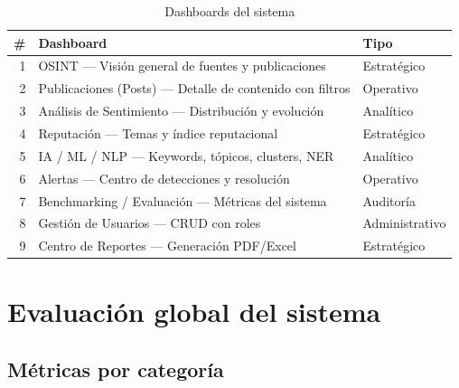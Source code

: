 \documentclass[11pt,a4paper]{article}
\begin{document}
\begin{table}[H]
\centering
\begin{tabularx}{\textwidth}{r X l}
\toprule
\textbf{\#} & \textbf{Dashboard} & \textbf{Tipo} \\
\midrule
1 & OSINT — Visión general de fuentes y publicaciones & Estratégico \\
\rowcolor{tablerow}
2 & Publicaciones (Posts) — Detalle de contenido con filtros & Operativo \\
3 & Análisis de Sentimiento — Distribución y evolución & Analítico \\
\rowcolor{tablerow}
4 & Reputación — Temas y índice reputacional & Estratégico \\
5 & IA / ML / NLP — Keywords, tópicos, clusters, NER & Analítico \\
\rowcolor{tablerow}
6 & Alertas — Centro de detecciones y resolución & Operativo \\
7 & Benchmarking / Evaluación — Métricas del sistema & Auditoría \\
\rowcolor{tablerow}
8 & Gestión de Usuarios — CRUD con roles & Administrativo \\
9 & Centro de Reportes — Generación PDF/Excel & Estratégico \\
\bottomrule
\end{tabularx}
\caption{Dashboards del sistema}
\end{table}

\section{Evaluación global del sistema}

\subsection{Métricas por categoría}
\end{document}
